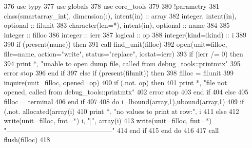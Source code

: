 \begin{DoxyCode}
376       \textcolor{keywordtype}{use }typy
377       \textcolor{keywordtype}{use }globals
378       \textcolor{keywordtype}{use }core_tools
379       
380       \textcolor{comment}{!parametry}
381       \textcolor{keywordtype}{class}(smartarray_int), \textcolor{keywordtype}{dimension(:)}, \textcolor{keywordtype}{intent(in)} :: array
382       \textcolor{keywordtype}{integer}, \textcolor{keywordtype}{intent(in)}, \textcolor{keywordtype}{optional} :: filunit   
383       \textcolor{keywordtype}{character(len=*)}, \textcolor{keywordtype}{intent(in)}, \textcolor{keywordtype}{optional} :: name
384 
385       \textcolor{keywordtype}{integer} :: filloc
386       \textcolor{keywordtype}{integer} :: ierr
387       \textcolor{keywordtype}{logical} :: op
388       \textcolor{keywordtype}{integer(kind=ikind)} :: i
389       
390       \textcolor{keywordflow}{if} (\textcolor{keyword}{present}(name)) \textcolor{keywordflow}{then}
391         \textcolor{keyword}{call }find_unit(filloc)
392         \textcolor{keyword}{open}(unit=filloc, file=name, action=\textcolor{stringliteral}{"write"}, status=\textcolor{stringliteral}{"replace"}, iostat\textcolor{comment}{=ierr)}
393 \textcolor{comment}{        }\textcolor{keywordflow}{if} (ierr /= 0) \textcolor{keywordflow}{then}
394           print *, \textcolor{stringliteral}{"unable to open dump file, called from debug\_tools::printmtx"}
395           error stop
396 \textcolor{keywordflow}{        end if}
397       \textcolor{keywordflow}{else} \textcolor{keywordflow}{if} (\textcolor{keyword}{present}(filunit)) \textcolor{keywordflow}{then}
398         filloc = filunit
399         \textcolor{keyword}{inquire}(unit=filloc, opened=op)
400         \textcolor{keywordflow}{if} (.not. op) \textcolor{keywordflow}{then}
401           print *, \textcolor{stringliteral}{"file not opened, called from debug\_tools::printmtx"}
402           error stop
403 \textcolor{keywordflow}{        end if}
404       \textcolor{keywordflow}{else}
405         filloc = terminal
406 \textcolor{keywordflow}{      end if}
407             
408       \textcolor{keywordflow}{do} i=lbound(array,1),ubound(array,1)
409         \textcolor{keywordflow}{if} (.not. \textcolor{keyword}{allocated}(array(i)%
410           print *, \textcolor{stringliteral}{"no values to print at row:"}, i
411         \textcolor{keywordflow}{else}
412           \textcolor{keyword}{write}(unit=filloc, fmt=*) i, \textcolor{stringliteral}{"|"}, array(i)%
413           \textcolor{keyword}{write}(unit=filloc, fmt=*) \textcolor{stringliteral}{"-----------------------------------------------"}
414 \textcolor{keywordflow}{        end if}
415 \textcolor{keywordflow}{      end do}
416       
417       \textcolor{keyword}{call }flush(filloc)
418       
\end{DoxyCode}
